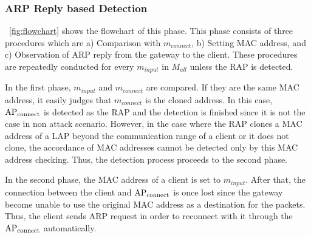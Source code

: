 \documentclass[conference]{IEEEtran}
\newcommand{\tarAP}{\rm AP_{connect}}
\newcommand{\tarMAC}{m_{connect}}
\newcommand{\inputMAC}{m_{input}}
\begin{document}
\subsubsection{ARP Reply based Detection}
\figurename~\ref{fig:flowchart} shows the flowchart of this phase.
This phase consists of three procedures which are a) Comparison with $\tarMAC$, b) Setting MAC address, and c) Observation of ARP reply from the gateway to the client.
These procedures are repeatedly conducted for every $m_{input}$ in $M_{all}$ unless the RAP is detected.

In the first phase, $\inputMAC$ and $\tarMAC$ are compared.
If they are the same MAC address, it easily judges that $\tarMAC$ is the cloned address.
In this case, $\tarAP$ is detected as the RAP and the detection is finished since it is not the case in non attack scenario.
However, in the case where the RAP clones a MAC address of a LAP beyond the communication range of a client or it does not clone, the accordance of MAC addresses cannot be detected only by this MAC address checking.
Thus, the detection process proceeds to the second phase.

In the second phase, the MAC address of a client is set to $\inputMAC$.
After that, the connection between the client and $\tarAP$ is once lost since the gateway become unable to use the original MAC address as a destination for the packets.
Thus, the client sends ARP request in order to reconnect with it through the $\tarAP$ automatically.
\end{document}
